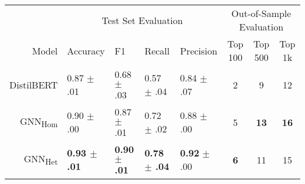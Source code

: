 \begin{tabular}{rllllccc}
\toprule
& \multicolumn{4}{c}{Test Set Evaluation} & \multicolumn{3}{c}{Out-of-Sample Evaluation} \\
\cmidrule(lr){2-5} \cmidrule(lr){6-8}
Model & Accuracy & F1 & Recall & Precision & Top 100 & Top 500 & Top 1k \\
\midrule
DistilBERT  & 0.87 $\pm$ .01          & 0.68 $\pm$ .03          & 0.57 $\pm$ .04 & 0.84 $\pm$ .07 & 2 & 9 & 12 \\
GNN\textsubscript{Hom}   & 0.90 $\pm$ .00          & 0.87 $\pm$ .01          & 0.72 $\pm$ .02 & 0.88 $\pm$ .00 & 5 & \textbf{13} & \textbf{16} \\
GNN\textsubscript{Het}   & \textbf{0.93 $\pm$ .01} & \textbf{0.90 $\pm$ .01} & \textbf{0.78 $\pm$ .04} & \textbf{0.92} $\pm$ .00 & \textbf{6} & 11 & 15 \\
\bottomrule
\end{tabular}
